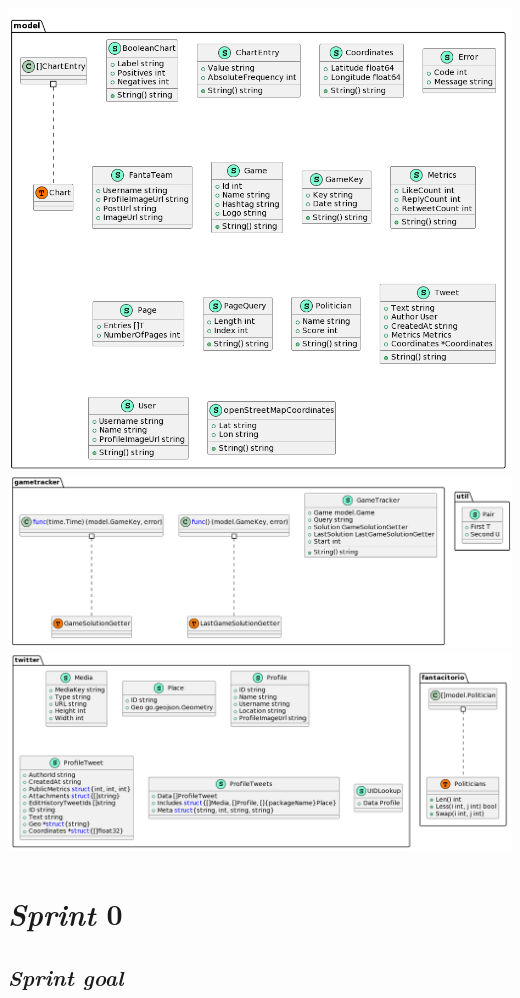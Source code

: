 \documentclass{article}
\begin{document}
\includegraphics[width=\textwidth]{backend-model.png}
\includegraphics[width=\textwidth]{backend-gametracker-util.png}
\includegraphics[width=\textwidth]{backend-twitter-fantacitorio.png}

\section{\emph{Sprint} 0}

\subsection{\emph{Sprint goal}}
\end{document}
